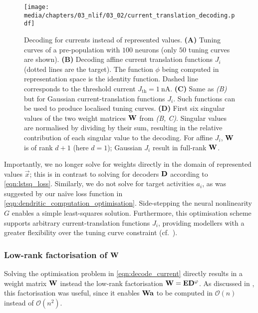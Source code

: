 \begin{figure}
	\texttt{[image: media/chapters/03\_nlif/03\_02/current\_translation\_decoding.pdf]}%
	{\label{fig:current_translation_decoding_a}}%
	{\label{fig:current_translation_decoding_b}}%
	{\label{fig:current_translation_decoding_c}}%
	{\label{fig:current_translation_decoding_d}}%
	\caption[Decoding for currents instead of represented values]{Decoding for currents instead of represented values. \textbf{(A)} Tuning curves of a pre-population with $100$ \LIF neurons (only $50$ tuning curves are shown). \textbf{(B)} Decoding affine current translation functions $J_i$ (dotted lines are the target). The function $\phi$ being computed in re\-pre\-sen\-tat\-ion space is the identity function. Dashed line corresponds to the threshold current $J_\mathrm{th} = \SI{1}{\nano\ampere}$.
	\textbf{(C)} Same as \emph{(B)} but for Gaussian current-translation functions $J_i$. Such functions can be used to produce localised tuning curves.
	\textbf{(D)} First six singular values of the two weight matrices $\mathbf{W}$ from \emph{(B, C)}.
	Singular values are normalised by dividing by their sum, resulting in the relative contribution of each singular value to the decoding.
	For affine $J_i$, $\mathbf{W}$ is of rank $d + 1$ (here $d = 1$);
	Gaussian $J_i$ result in full-rank $\mathbf{W}$.
	}
\end{figure}

Importantly, we no longer solve for weights directly in the domain of represented values $\vec x$; this is in contrast to solving for decoders $\mathbf{D}$ according to \cref{eqn:lstsq_loss}.
Similarly, we do not solve for target activities $a_i$, as was suggested by our na\"ive loss function in \cref{eqn:dendritic_computation_optimisation}.
Side-stepping the neural nonlinearity $G$ enables a simple least-squares solution.
Furthermore, this optimisation scheme supports arbitrary current-translation functions $J_i$, providing modellers with a greater flexibility over the tuning curve constraint (cf.~).

\subsubsection{Low-rank factorisation of $\mathbf{W}$}
Solving the optimisation problem in \cref{eqn:decode_current} directly results in a weight matrix $\mathbf{W}$ instead the low-rank factorisation $\mathbf{W} = \mathbf{E} \mathbf{D}^\varphi$.
As discussed in , this factorisation was useful, since it enables $\mathbf{W} \mathbf{a}$ to be computed in $\mathcal{O}(n)$ instead of $\mathcal{O}(n^2)$.

